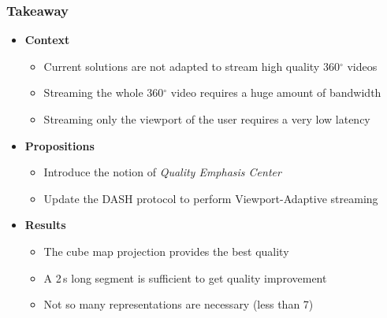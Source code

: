 \begin{frame}[c,label=Takeaway]
    \frametitle{Takeaway}
    \vfill
    \begin{itemize}[<+->]
        \item \textbf{Context}
        \begin{itemize}[<.->]
           \item Current solutions are not adapted to stream high quality 360$^{\circ}$ videos
           \item Streaming the whole 360$^{\circ}$ video requires a huge amount of bandwidth
           \item Streaming only the viewport of the user requires a very low latency
        \end{itemize}
    \end{itemize}
    \vfill
    \begin{itemize}[<+->]
        \item \textbf{Propositions}
        \begin{itemize}[<.->]
           \item Introduce the notion of \emph{Quality Emphasis Center}
           \item Update the DASH protocol to perform Viewport-Adaptive streaming
        \end{itemize}
    \end{itemize}

    \vfill
    \begin{itemize}[<+->]
        \item \textbf{Results}
        \begin{itemize}[<.->]
           \item The cube map projection provides the best quality
           \item A 2\,s long segment is sufficient to get quality improvement
           \item Not so many representations are necessary (less than 7)
        \end{itemize}
    \end{itemize}
    \vfill
    \setcounter{totalTakeawaySlides}{\valueBP}
\end{frame}


